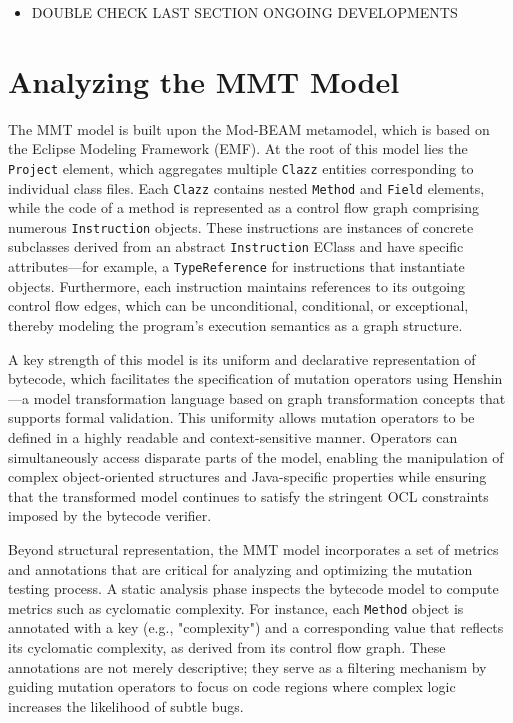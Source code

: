 \documentclass[sigplan, nonacm]{acmart}
\begin{document}
\begin{itemize}
	\item DOUBLE CHECK LAST SECTION ONGOING DEVELOPMENTS
\end{itemize}

\section{Analyzing the MMT Model}

The MMT model is built upon the Mod-BEAM metamodel, which is based on the
Eclipse Modeling Framework (EMF). At the root of this model lies the
\texttt{Project} element, which aggregates multiple \texttt{Clazz} entities
corresponding to individual class files. Each \texttt{Clazz} contains nested
\texttt{Method} and \texttt{Field} elements, while the code of a method is
represented as a control flow graph comprising numerous \texttt{Instruction}
objects. These instructions are instances of concrete subclasses derived from
an abstract \texttt{Instruction} EClass and have specific attributes—for
example, a \texttt{TypeReference} for instructions that instantiate objects.
Furthermore, each instruction maintains references to its outgoing control
flow edges, which can be unconditional, conditional, or exceptional, thereby
modeling the program's execution semantics as a graph structure.

A key strength of this model is its uniform and declarative representation of
bytecode, which facilitates the specification of mutation operators using
Henshin—a model transformation language based on graph transformation
concepts that supports formal validation. This uniformity allows mutation
operators to be defined in a highly readable and context-sensitive manner.
Operators can simultaneously access disparate parts of the model, enabling
the manipulation of complex object-oriented structures and Java-specific
properties while ensuring that the transformed model continues to satisfy the
stringent OCL constraints imposed by the bytecode verifier.

Beyond structural representation, the MMT model incorporates a set of metrics
and annotations that are critical for analyzing and optimizing the mutation
testing process. A static analysis phase inspects the bytecode model to
compute metrics such as cyclomatic complexity. For instance, each
\texttt{Method} object is annotated with a key (e.g., "complexity") and a
corresponding value that reflects its cyclomatic complexity, as derived from
its control flow graph. These annotations are not merely descriptive; they
serve as a filtering mechanism by guiding mutation operators to focus on code
regions where complex logic increases the likelihood of subtle bugs.
\end{document}
